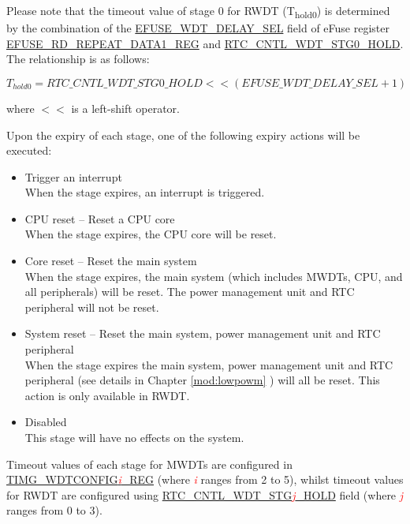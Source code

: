 \documentclass[main\_\_EN.tex]{subfiles}
\begin{document}
Please note that the timeout value of stage 0 for RWDT (T\textsubscript{hold0}) is determined by the combination of the  \hyperref[fielddesc:EFUSEWDTDELAYSEL]{EFUSE\_WDT\_DELAY\_SEL} field of eFuse register \hyperref[regdesc:EFUSERDREPEATDATA1REG]{EFUSE\_RD\_REPEAT\_DATA1\_REG} and \hyperref[fielddesc:RTCCNTLWDTSTG0HOLD]{RTC\_CNTL\_WDT\_STG0\_HOLD}. The relationship is as follows:

\begin{displaymath}
T_{hold0} = \hyperref[fielddesc:RTCCNTLWDTSTG0HOLD]{RTC\_CNTL\_WDT\_STG0\_HOLD}   << (\hyperref[fielddesc:EFUSEWDTDELAYSEL]{EFUSE\_WDT\_DELAY\_SEL} + 1)
\end{displaymath}

where $<<$ is a left-shift operator.

Upon the expiry of each stage, one of the following expiry actions will be executed:
\begin{itemize}
    \item Trigger an interrupt\\
    When the stage expires, an interrupt is triggered.
    \item CPU reset -- Reset a CPU core\\
    When the stage expires, the CPU core will be reset.
    \item Core reset -- Reset the main system\\
    When the stage expires, the main system (which includes MWDTs, CPU, and all peripherals) will be reset. The power management unit and RTC peripheral will not be reset.
    \item System reset -- Reset the main system, power management unit and RTC peripheral\\
    When the stage expires the main system, power management unit and RTC peripheral (see details in Chapter \ref{mod:lowpowm} \textit{}) will all be reset. This action is only available in RWDT.
    \item Disabled\\
    This stage will have no effects on the system.
\end{itemize}

Timeout values of each stage for MWDTs are configured in \hyperref[regdesc:TIMGWDTCONFIG2REG]{TIMG\_WDTCONFIG\textcolor{red}{\it{i}}\_REG} (where \textcolor{red}{\it{i}} ranges from 2 to 5), whilst timeout values for RWDT are configured using \hyperref[fielddesc:RTCCNTLWDTSTG3]{RTC\_CNTL\_WDT\_STG\textcolor{red}{\it{j}}\_HOLD} field (where \textcolor{red}{\it{j}} ranges from 0 to 3).
\end{document}
